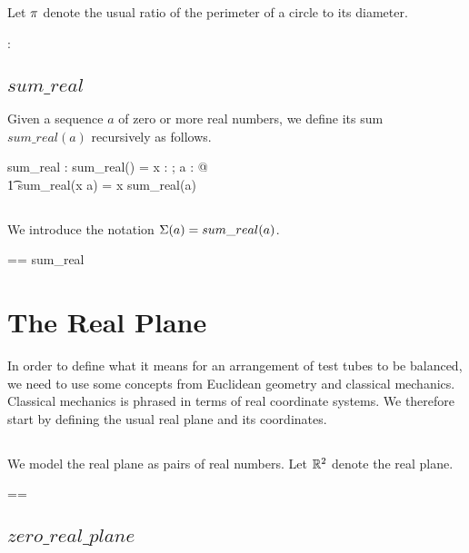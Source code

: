 \documentclass[11pt, oneside]{article}
\begin{document}
Let $\pi$ denote the usual ratio of the perimeter of a circle to its diameter.

\begin{axdef}
	\piR : \R
\end{axdef}

\subsection{$sum\_real$}

Given a sequence $a$ of zero or more real numbers,
we define its sum $sum\_real(a)$ recursively as follows.

\begin{axdef}
	sum\_real : \seq \R \fun \R
\where
	sum\_real(\langle \rangle) = \zeroR
\also
	\forall x : \R; a : \seq \R @ \\
	\t1	sum\_real(\langle x \rangle \cat a) = x \addR sum\_real(a)
\end{axdef}

\subsection{}

We introduce the notation $\Sigma(a) = sum\_real(a)$.

\begin{zed}
	\sumR == sum\_real
\end{zed}

\section{The Real Plane}

In order to define what it means for an arrangement of test tubes to be balanced,
we need to use some concepts from Euclidean geometry and classical mechanics.
Classical mechanics is phrased in terms of real coordinate systems.
We therefore start by defining the usual real plane and its coordinates.

\subsection{}

We model the real plane as pairs of real numbers.
Let $\mathbb{R}^2$ denote the real plane.

\begin{zed}
	\Rtwo == \R \cross \R
\end{zed}

\subsection{$zero\_real\_plane$}
\end{document}
